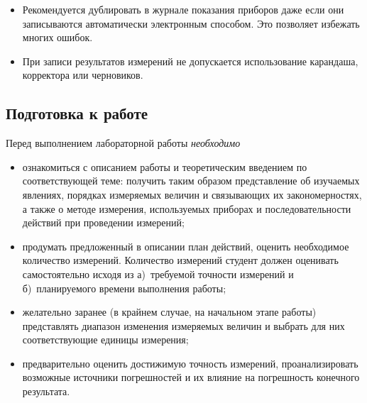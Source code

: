 \begin{itemize}
    \item Рекомендуется дублировать в журнале показания приборов даже если они
записываются автоматически электронным способом. Это позволяет избежать многих
ошибок.

    \item При записи результатов измерений не допускается использование карандаша, корректора или черновиков.
\end{itemize}

\subsection{Подготовка к работе}

Перед выполнением лабораторной работы \emph{необходимо}
\begin{itemize}
    \small
    \item ознакомиться с описанием работы и теоретическим введением по
соответствующей теме: получить таким образом представление об
изучаемых явлениях, порядках измеряемых величин и связывающих их закономерностях,
а также о методе измерения, используемых приборах и последовательности
действий при проведении измерений;


    \item продумать предложенный в описании план действий, оценить необходимое
    количество измерений. Количество измерений студент должен оценивать
    самостоятельно исходя из а)~требуемой точности измерений и б)~планируемого времени выполнения работы;

    \item желательно заранее (в крайнем случае, на начальном этапе работы)
    представлять диапазон изменения измеряемых величин и выбрать для них
    соответствующие единицы измерения;

    \item предварительно оценить достижимую точность
    измерений, проанализировать возможные источники погрешностей и их
    влияние на погрешность конечного результата.
\end{itemize}

